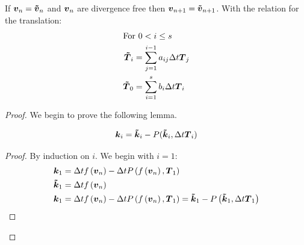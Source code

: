 \begin{theorem}
If ${\boldsymbol {v}}_{n}={\boldsymbol {\tilde{v}}}_{n}$ and ${\boldsymbol {v}}_n$ are divergence free then ${\boldsymbol {v}}_{n+1}={\boldsymbol {\tilde{v}}}_{n+1}$.
With the relation for the translation:
\begin{align}
\intertext{For $0< i\leq s$}
  {\boldsymbol {\tilde{T}}}_i&=\sum_{j=1}^{i-1}a_{ij}\Delta t {\boldsymbol {T}}_{j}\\
  {\boldsymbol {\tilde{T}}}_0&=\sum_{i=1}^{s}b_{i}\Delta t {\boldsymbol {T}}_{i}
\end{align}

\end{theorem}
\begin{proof}
We begin to prove the following lemma.
\begin{lemma}
\begin{equation}
  {\boldsymbol {k}}_{i}={\boldsymbol {\tilde{k}}}_{i}-P({\boldsymbol {\tilde{k}}}_{i},\Delta t {\boldsymbol {T}}_{i})
\end{equation}
\end{lemma}
\begin{proof}
By induction on $i$.
We begin with $i=1$:
\begin{align}
  {\boldsymbol {k}}_{1}&=\Delta tf\left({\boldsymbol {v}}_n\right)-\Delta tP\left(f\left({\boldsymbol {v}}_n\right),{\boldsymbol {T}}_{1}\right)\\
{\boldsymbol {\tilde{k}}}_{1}&=\Delta tf\left({\boldsymbol {{\boldsymbol {v}}}}_n\right)\\
  {\boldsymbol {k}}_{1}&=\Delta t f\left({\boldsymbol {v}}_n\right)-\Delta tP\left(f\left({\boldsymbol {v}}_n\right),{\boldsymbol {T}}_{1}\right)={\boldsymbol {\tilde{k}}}_1-P\left({\boldsymbol {\tilde{k}}}_1,\Delta t {\boldsymbol {T}}_{1}\right)
\end{align}


\end{proof}
\end{proof}
